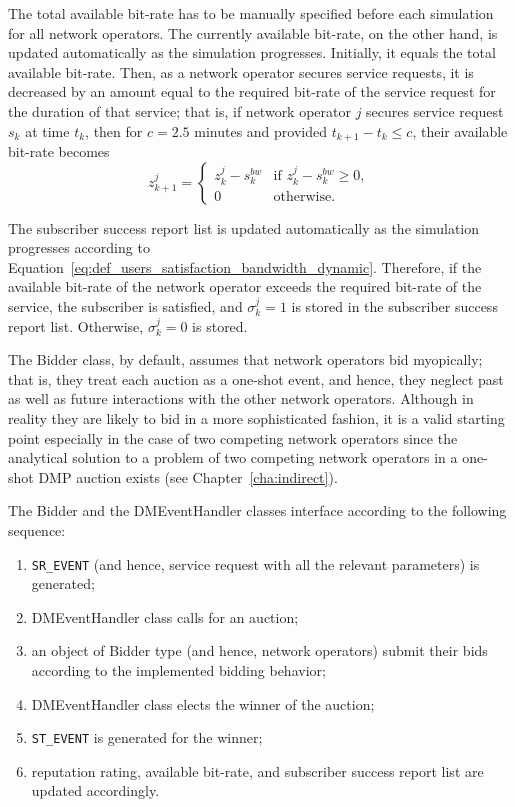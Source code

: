 The total available bit-rate has to be manually specified before each simulation for all network operators. The currently available bit-rate, on the other hand, is updated automatically as the simulation progresses. Initially, it equals the total available bit-rate. Then, as a network operator secures service requests, it is decreased by an amount equal to the required bit-rate of the service request for the duration of that service; that is, if network operator $j$ secures service request $s_k$ at time $t_k$, then for $c=2.5$ minutes and provided $t_{k+1}-t_k\le c$, their available bit-rate becomes
\begin{equation*}
	z^j_{k+1} =
	\left\{
	\begin{array}{ll}
		z^j_k - s^{bw}_k &\text{if } z^j_k - s^{bw}_k\ge 0, \\
		0 &\text{otherwise}.
	\end{array}
	\right.
\end{equation*}

The subscriber success report list is updated automatically as the simulation progresses according to Equation~\eqref{eq:def_users_satisfaction_bandwidth_dynamic}. Therefore, if the available bit-rate of the network operator exceeds the required bit-rate of the service, the subscriber is satisfied, and $\sigma_k^j = 1$ is stored in the subscriber success report list. Otherwise, $\sigma_k^j = 0$ is stored.

The Bidder class, by default, assumes that network operators bid myopically; that is, they treat each auction as a one-shot event, and hence, they neglect past as well as future interactions with the other network operators. Although in reality they are likely to bid in a more sophisticated fashion, it is a valid starting point especially in the case of two competing network operators since the analytical solution to a problem of two competing network operators in a one-shot DMP auction exists (see Chapter~\ref{cha:indirect}). 

The Bidder and the DMEventHandler classes interface according to the following sequence:
\begin{enumerate}
	\item \lstinline{SR_EVENT} (and hence, service request with all the relevant parameters) is generated;
	\item DMEventHandler class calls for an auction;
	\item an object of Bidder type (and hence, network operators) submit their bids according to the implemented bidding behavior;
	\item DMEventHandler class elects the winner of the auction;
	\item \lstinline{ST_EVENT} is generated for the winner;
	\item reputation rating, available bit-rate, and subscriber success report list are updated accordingly.
\end{enumerate}

